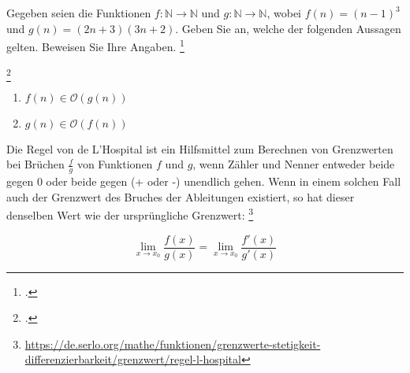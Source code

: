 \documentclass{bschlangaul-aufgabe}
\begin{document}

Gegeben seien die Funktionen $f \colon \mathbb{N} \rightarrow
\mathbb{N}$ und $g \colon \mathbb{N} \rightarrow \mathbb{N}$, wobei $f
(n) = (n - 1)^3$ und $g(n) = (2n + 3)(3n + 2)$. Geben Sie an, welche der
folgenden Aussagen gelten. Beweisen Sie Ihre
Angaben.
\footcite[Aufgabe 6]{examen:66115:2012:09}

\footcite[Aufgabe 4]{aud:ab:2}
\begin{enumerate}
\item $f(n) \in \mathcal{O}(g(n))$
\item $g(n) \in \mathcal{O}(f(n))$
\end{enumerate}

\begin{bExkurs}
Die Regel von de L’Hospital ist ein Hilfsmittel zum Berechnen von
Grenzwerten bei Brüchen $\frac{f}{g}$ von Funktionen $f$ und $g$, wenn
Zähler und Nenner entweder beide gegen $0$ oder beide gegen (+ oder -)
unendlich gehen. Wenn in einem solchen Fall auch der Grenzwert des
Bruches der Ableitungen existiert, so hat dieser denselben Wert wie der
ursprüngliche Grenzwert:
\footnote{\url{https://de.serlo.org/mathe/funktionen/grenzwerte-stetigkeit-differenzierbarkeit/grenzwert/regel-l-hospital}}

\begin{displaymath}
\lim_{x \to x_0} \frac{f(x)}{g(x)} = \lim_{x \to x_0} \frac{f'(x)}{g'(x)}
\end{displaymath}

\end{bExkurs}
\end{document}
